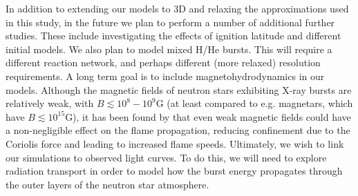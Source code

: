 \documentclass[preprint,times,tighten]{aastex63}
\newcommand{\castro}{{\sf Castro}}
\newcommand{\pynucastro}{{\sf pynucastro}}
\begin{document}
In addition to extending our models to 3D and relaxing the approximations used in 
this study, in the future we plan to perform a number of additional further studies. 
These include investigating the effects of ignition latitude and different initial 
models. We also plan to model mixed H/He bursts. This will require a
different reaction network, and perhaps different (more relaxed)
resolution requirements. A long term goal is to include magnetohydrodynamics in our 
models. Although the magnetic fields of neutron stars exhibiting X-ray bursts are 
relatively weak, with $B \lesssim 10^8 - 10^9$G \citep{mukherjee2015magnetic} (at
 least compared to e.g. magnetars, which have $B\lesssim 10^{15}$G), it has been 
 found by \citet{art-2016-cavecchi-etal} that even weak magnetic fields could have 
 a non-negligible effect on the flame propagation, reducing confinement due to the 
 Coriolis force and leading to increased flame speeds. Ultimately, we wish to link 
 our simulations to observed light curves. To do this, we will need to explore 
 radiation transport in order to model how the burst energy propagates through the 
 outer layers of the neutron star atmosphere. 






\end{document}
